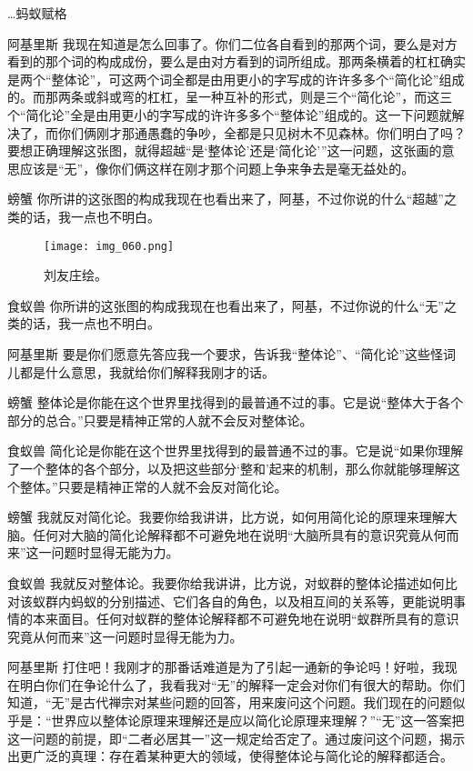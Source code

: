 \begin{dialog}{…蚂蚁赋格}
\begin{dialogue}
\item[阿基里斯]我现在知道是怎么回事了。你们二位各自看到的那两个词，要么是对方看到的那个词的构成成份，要么是由对方看到的词所组成。那两条横着的杠杠确实是两个“整体论”，可这两个词全都是由用更小的字写成的许许多多个“简化论”组成的。而那两条或斜或弯的杠杠，呈一种互补的形式，则是三个“简化论”，而这三个“简化论”全是由用更小的字写成的许许多多个“整体论”组成的。这一下问题就解决了，而你们俩刚才那通愚蠢的争吵，全都是只见树木不见森林。你们明白了吗？要想正确理解这张图，就得超越“是‘整体论’还是‘简化论’”这一问题，这张画的意思应该是“无”，像你们俩这样在刚才那个问题上争来争去是毫无益处的。

\item[螃蟹]你所讲的这张图的构成我现在也看出来了，阿基，不过你说的什么“超越”之类的话，我一点也不明白。

\begin{figure}
\texttt{[image: img\_060.png]}
\caption[“无之图”]
  {刘友庄绘。}
\end{figure}

\item[食蚁兽]你所讲的这张图的构成我现在也看出来了，阿基，不过你说的什么“无”之类的话，我一点也不明白。

\item[阿基里斯]要是你们愿意先答应我一个要求，告诉我“整体论”、“简化论”这些怪词儿都是什么意思，我就给你们解释我刚才的话。

\item[螃蟹]整体论是你能在这个世界里找得到的最普通不过的事。它是说“整体大于各个部分的总合。”只要是精神正常的人就不会反对整体论。

\item[食蚁兽]简化论是你能在这个世界里找得到的最普通不过的事。它是说“如果你理解了一个整体的各个部分，以及把这些部分‘整和’起来的机制，那么你就能够理解这个整体。”只要是精神正常的人就不会反对简化论。

\item[螃蟹]我就反对简化论。我要你给我讲讲，比方说，如何用简化论的原理来理解大脑。任何对大脑的简化论解释都不可避免地在说明“大脑所具有的意识究竟从何而来”这一问题时显得无能为力。

\item[食蚁兽]我就反对整体论。我要你给我讲讲，比方说，对蚁群的整体论描述如何比对该蚁群内蚂蚁的分别描述、它们各自的角色，以及相互间的关系等，更能说明事情的本来面目。任何对蚁群的整体论解释都不可避免地在说明“蚁群所具有的意识究竟从何而来”这一问题时显得无能为力。

\item[阿基里斯]打住吧！我刚才的那番话难道是为了引起一通新的争论吗！好啦，我现在明白你们在争论什么了，我看我对“无”的解释一定会对你们有很大的帮助。你们知道，“无”是古代禅宗对某些问题的回答，用来废问这个问题。我们现在的问题似乎是：“世界应以整体论原理来理解还是应以简化论原理来理解？”“无”这一答案把这一问题的前提，即“二者必居其一”这一规定给否定了。通过废问这个问题，揭示出更广泛的真理：存在着某种更大的领域，使得整体论与简化论的解释都适合。


\end{dialogue}
\end{dialog}
